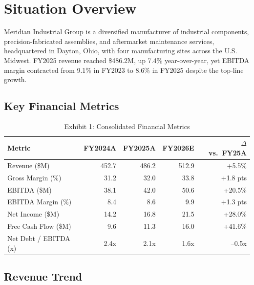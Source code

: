 \section{Situation Overview}

Meridian Industrial Group is a diversified manufacturer of industrial components, precision-fabricated assemblies, and aftermarket maintenance services, headquartered in Dayton, Ohio, with four manufacturing sites across the U.S. Midwest. FY2025 revenue reached \$486.2M, up 7.4\% year-over-year, yet EBITDA margin contracted from 9.1\% in FY2023 to 8.6\% in FY2025 despite the top-line growth.

\subsection{Key Financial Metrics}

\begin{table}[htbp]
\centering
\small
\begin{tabular}{@{}lrrrr@{}}
\toprule
\textbf{Metric} & \textbf{FY2024A} & \textbf{FY2025A} & \textbf{FY2026E} & \textbf{$\Delta$ vs.\ FY25A} \\
\midrule
Revenue (\$M)          & 452.7 & 486.2 & 512.9 & +5.5\% \\
Gross Margin (\%)      & 31.2  & 32.0  & 33.8  & +1.8 pts \\
EBITDA (\$M)           & 38.1  & 42.0  & 50.6  & +20.5\% \\
EBITDA Margin (\%)     & 8.4   & 8.6   & 9.9   & +1.3 pts \\
Net Income (\$M)       & 14.2  & 16.8  & 21.5  & +28.0\% \\
Free Cash Flow (\$M)   & 9.6   & 11.3  & 16.0  & +41.6\% \\
Net Debt / EBITDA (x)  & 2.4x  & 2.1x  & 1.6x  & --0.5x \\
\bottomrule
\end{tabular}
\caption{Exhibit 1: Consolidated Financial Metrics}
\end{table}

\subsection{Revenue Trend}

